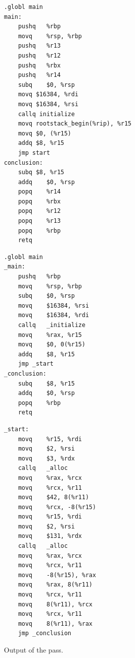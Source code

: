 \documentclass[11pt]{book}
\begin{document}
\begin{figure}[htbp]
\begin{minipage}[t]{0.45\textwidth}
\begin{lstlisting}[basicstyle=\ttfamily\scriptsize]
	.globl main
main:
	pushq	%rbp
	movq	%rsp, %rbp
	pushq	%r13
	pushq	%r12
	pushq	%rbx
	pushq	%r14
	subq	$0, %rsp
	movq $16384, %rdi
	movq $16384, %rsi
	callq initialize
	movq rootstack_begin(%rip), %r15
	movq $0, (%r15)
	addq $8, %r15
	jmp start
conclusion:
	subq $8, %r15
	addq	$0, %rsp
	popq	%r14
	popq	%rbx
	popq	%r12
	popq	%r13
	popq	%rbp
	retq
\end{lstlisting}
\end{minipage}
\begin{minipage}{0.45\textwidth}
\begin{lstlisting}[basicstyle=\ttfamily\scriptsize,style=ocaml]
	.globl main
_main:
	pushq	%rbp
	movq	%rsp, %rbp
	subq	$0, %rsp
	movq	$16384, %rsi
	movq	$16384, %rdi
	callq	_initialize
	movq	%rax, %r15
	movq	$0, 0(%r15)
	addq	$8, %r15
	jmp	_start
_conclusion:
	subq	$8, %r15
	addq	$0, %rsp
	popq	%rbp
	retq
\end{lstlisting}
\end{minipage}
\begin{minipage}[r]{0.45\textwidth}
\begin{lstlisting}[basicstyle=\ttfamily\scriptsize,style=ocaml]
_start:
	movq	%r15, %rdi
	movq	$2, %rsi
	movq	$3, %rdx
	callq	_alloc
	movq	%rax, %rcx
	movq	%rcx, %r11
	movq	$42, 8(%r11)
	movq	%rcx, -8(%r15)
	movq	%r15, %rdi
	movq	$2, %rsi
	movq	$131, %rdx
	callq	_alloc
	movq	%rax, %rcx
	movq	%rcx, %r11
	movq	-8(%r15), %rax
	movq	%rax, 8(%r11)
	movq	%rcx, %r11
	movq	8(%r11), %rcx
	movq	%rcx, %r11
	movq	8(%r11), %rax
	jmp	_conclusion
\end{lstlisting}
\end{minipage}
\caption{Output of the  pass.}
\label{fig:print-x86-output-gc}
\end{figure}
\end{document}
